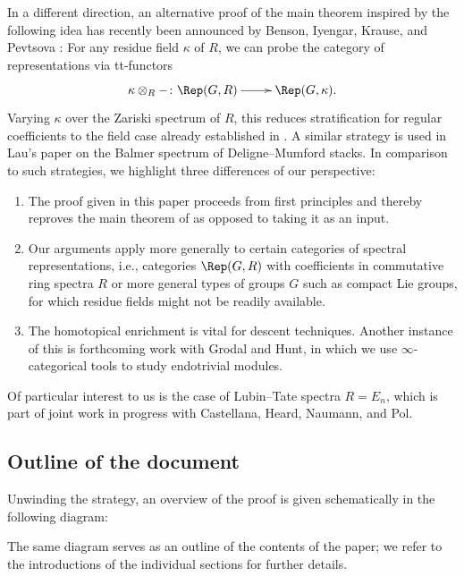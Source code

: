 \documentclass{amsart}%
\numberwithin{equation}{section}%
\theoremstyle{remark}
\newcounter{enum-resume-hack}
\begin{document}
In a different direction, an alternative proof of the main theorem inspired by the following idea has recently been announced by Benson, Iyengar, Krause, and Pevtsova \cite{bikp_fiberwisestratification}: For any residue field $\kappa$ of $R$, we can probe the category of representations via tt-functors
\[
\xymatrix{\kappa\otimes_R - \colon \Rep(G,R) \ar[r] & \Rep(G,\kappa).}
\]
Varying $\kappa$ over the Zariski spectrum of $R$, this reduces stratification for regular coefficients to the field case already established in \cite{BensonIyengarKrause11a}. A similar strategy is used in Lau's paper \cite{lau_spcdmstacks} on the Balmer spectrum of Deligne--Mumford stacks. In comparison to such strategies, we highlight three differences of our perspective: 
\begin{enumerate}
    \item The proof given in this paper proceeds from first principles and thereby reproves the main theorem of \cite{BensonIyengarKrause11a} as opposed to taking it as an input.
    \item Our arguments apply more generally to certain categories of spectral representations, i.e., categories $\Rep(G,R)$ with coefficients in commutative ring spectra $R$ or more general types of groups $G$ such as compact Lie groups, for which residue fields might not be readily available. 
    \item The homotopical enrichment is vital for descent techniques. Another instance of this is forthcoming work with Grodal and Hunt, in which we use $\infty$-categorical tools to study endotrivial modules. 
\end{enumerate}
Of particular interest to us is the case of Lubin--Tate spectra $R = E_n$, which is part of joint work in progress with Castellana, Heard, Naumann, and Pol. 

\subsection{Outline of the document}

Unwinding the strategy, an overview of the proof is given schematically in the following diagram:

\begin{figure}[omitted: a diagram of this paper's results, not reproduced here]\end{figure}

The same diagram serves as an outline of the contents of the paper; we refer to the introductions of the individual sections for further details.
\end{document}
